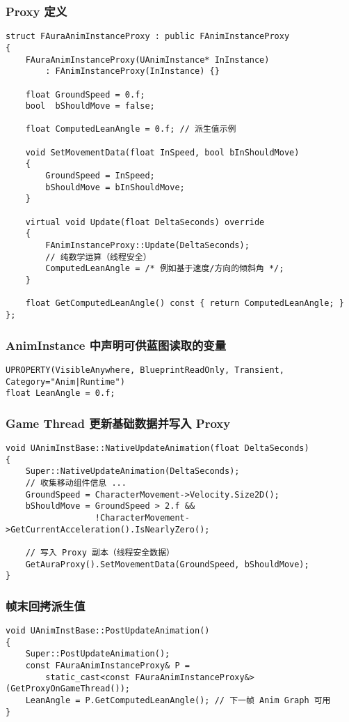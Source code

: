 \documentclass[10pt,openright,oneside,CJKmath]{MyBook}
\begin{document}
\subsubsection*{Proxy 定义}
\begin{lstlisting}[style=cpp]
struct FAuraAnimInstanceProxy : public FAnimInstanceProxy
{
    FAuraAnimInstanceProxy(UAnimInstance* InInstance)
        : FAnimInstanceProxy(InInstance) {}

    float GroundSpeed = 0.f;
    bool  bShouldMove = false;

    float ComputedLeanAngle = 0.f; // 派生值示例

    void SetMovementData(float InSpeed, bool bInShouldMove)
    {
        GroundSpeed = InSpeed;
        bShouldMove = bInShouldMove;
    }

    virtual void Update(float DeltaSeconds) override
    {
        FAnimInstanceProxy::Update(DeltaSeconds);
        // 纯数学运算（线程安全）
        ComputedLeanAngle = /* 例如基于速度/方向的倾斜角 */;
    }

    float GetComputedLeanAngle() const { return ComputedLeanAngle; }
};
\end{lstlisting}

\subsubsection*{AnimInstance 中声明可供蓝图读取的变量}
\begin{lstlisting}[style=cpp]
UPROPERTY(VisibleAnywhere, BlueprintReadOnly, Transient, Category="Anim|Runtime")
float LeanAngle = 0.f;
\end{lstlisting}

\subsubsection*{Game Thread 更新基础数据并写入 Proxy}
\begin{lstlisting}[style=cpp]
void UAnimInstBase::NativeUpdateAnimation(float DeltaSeconds)
{
    Super::NativeUpdateAnimation(DeltaSeconds);
    // 收集移动组件信息 ...
    GroundSpeed = CharacterMovement->Velocity.Size2D();
    bShouldMove = GroundSpeed > 2.f &&
                  !CharacterMovement->GetCurrentAcceleration().IsNearlyZero();

    // 写入 Proxy 副本（线程安全数据）
    GetAuraProxy().SetMovementData(GroundSpeed, bShouldMove);
}
\end{lstlisting}

\subsubsection*{帧末回拷派生值}
\begin{lstlisting}[style=cpp]
void UAnimInstBase::PostUpdateAnimation()
{
    Super::PostUpdateAnimation();
    const FAuraAnimInstanceProxy& P =
        static_cast<const FAuraAnimInstanceProxy&>(GetProxyOnGameThread());
    LeanAngle = P.GetComputedLeanAngle(); // 下一帧 Anim Graph 可用
}
\end{lstlisting}
\end{document}

